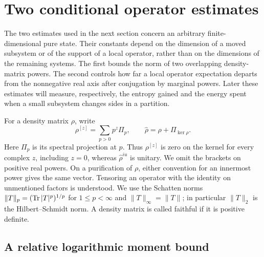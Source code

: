 \section{Two conditional operator estimates}\label{sec:conditional}

The two estimates used in the next section concern an arbitrary
finite-dimensional pure state.
Their constants depend on the dimension of a moved subsystem or of the
support of a local operator, rather than on the dimensions of the remaining
systems.  The first bounds the norm of two overlapping density-matrix
powers.  The second controls how far a local operator expectation departs
from the nonnegative real axis after conjugation by marginal powers.  Later
these estimates
will measure, respectively, the entropy gained and the energy spent when
a small subsystem changes sides in a partition.

For a density matrix $\rho$, write
\[
 \rho^{[z]}=\sum_{p>0}p^z\Pi_p,
 \qquad
 \widehat\rho=\rho+\Pi_{\ker\rho}.
\]
Here $\Pi_p$ is its spectral projection at $p$.  Thus $\rho^{[z]}$ is
zero on the kernel for every complex $z$, including $z=0$, whereas
$\widehat\rho^{iu}$ is unitary.  We omit the brackets on positive real
powers.  On a purification of $\rho$, either convention for an innermost
power gives the same vector.  Tensoring an operator with the identity on
unmentioned factors is understood.
We use the Schatten norms $\|T\|_p=(\operatorname{Tr}|T|^p)^{1/p}$ for
$1\le p<\infty$ and $\|T\|_\infty=\|T\|$; in particular
$\|T\|_2$ is the Hilbert--Schmidt norm.
A density matrix is called faithful if it is positive definite.

\subsection{A relative logarithmic moment bound}


